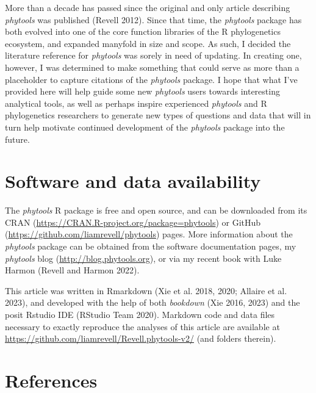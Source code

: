 \documentclass[fleqn,10pt,lineno]{wlpeerj} %
\begin{document}
More than a decade has passed since the original and only article describing \emph{phytools} was published (Revell 2012). Since that time, the \emph{phytools} package has both evolved into one of the core function libraries of the R phylogenetics ecosystem, and expanded manyfold in size and scope. As such, I decided the literature reference for \emph{phytools} was sorely in need of updating. In creating one, however, I was determined to make something that could serve as more than a placeholder to capture citations of the \emph{phytools} package. I hope that what I've provided here will help guide some new \emph{phytools} users towards interesting analytical tools, as well as perhaps inspire experienced \emph{phytools} and R phylogenetics researchers to generate new types of questions and data that will in turn help motivate continued development of the \emph{phytools} package into the future.

\hypertarget{software-and-data-availability}{%
\section{Software and data availability}\label{software-and-data-availability}}

The \emph{phytools} R package is free and open source, and can be downloaded from its CRAN (\url{https://CRAN.R-project.org/package=phytools}) or GitHub (\url{https://github.com/liamrevell/phytools}) pages. More information about the \emph{phytools} package can be obtained from the software documentation pages, my \emph{phytools} blog (\url{http://blog.phytools.org}), or via my recent book with Luke Harmon (Revell and Harmon 2022).

This article was written in Rmarkdown (Xie et al. 2018, 2020; Allaire et al. 2023), and developed with the help of both \emph{bookdown} (Xie 2016, 2023) and the posit Rstudio IDE (RStudio Team 2020). Markdown code and data files necessary to exactly reproduce the analyses of this article are available at \url{https://github.com/liamrevell/Revell.phytools-v2/} (and folders therein).

\hypertarget{references}{%
\section*{References}\label{references}}
\end{document}
